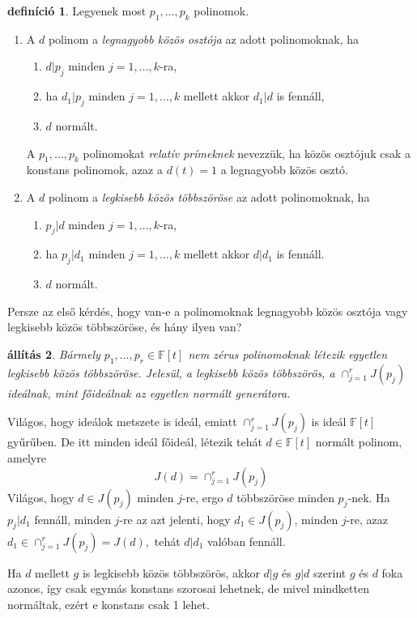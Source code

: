 \documentclass[a4paper, showtrims]{memoir}
\makeatletter
\renewenvironment{proof}[1][\proofname]
    {\par\pushQED{\qed}%
    \normalfont \topsep6\p@\@plus6\p@\relax
    \trivlist
    \item[\hskip\labelsep
        \itshape
    #1\@addpunct{:}]\ignorespaces}
    {\popQED\endtrivlist\@endpefalse}
\theoremstyle{plain}
\newtheorem{proposition}{állítás}[chapter]
\theoremstyle{remark}
\theoremstyle{definition}
\newtheorem{definition}[proposition]{definíció}
\makeatother
\begin{document}
\begin{definition}
	Legyenek most $p_1,\ldots,p_k$ polinomok.
	\begin{enumerate}
		\item A $d$ polinom a \emph{legnagyobb közös osztója} az adott polinomoknak,
		      ha
		      \begin{enumerate}
			      \item $d|p_j$ minden $j=1,\ldots,k$-ra,
			      \item ha $d_1|p_j$ minden $j=1,\ldots,k$ mellett akkor $d_1|d$ is fennáll,
			      \item $d$ normált.
		      \end{enumerate}
		      A $p_1,\ldots,p_k$ polinomokat \emph{relatív prímeknek} nevezzük,
		      ha közös osztójuk csak a konstans polinomok,
		      azaz a $d\left( t \right)=1$ a legnagyobb közös osztó.
		\item A $d$ polinom a \emph{legkisebb közös többszöröse} az adott polinomoknak,
		      ha
		      \begin{enumerate}
			      \item $p_j|d$ minden $j=1,\ldots,k$-ra,
			      \item ha $p_j|d_1$ minden $j=1,\ldots,k$ mellett akkor $d|d_1$ is fennáll.
			      \item $d$ normált.\qedhere
		      \end{enumerate}
	\end{enumerate}
\end{definition}
Persze az első kérdés, hogy van-e a polinomoknak legnagyobb közös osztója vagy legkisebb közös többszöröse, és hány ilyen van?
\begin{proposition}\label{pr:lkkt}
	Bármely $p_1,\ldots,p_r\in\mathbb{F}\left[ t \right]$ nem zérus polinomoknak
	létezik egyetlen legkisebb közös többszöröse.
	Jelesül, a legkisebb közös többszörös, a
	\(
	\cap_{j=1}^rJ\left( p_j \right)
	\) ideálnak, mint főideálnak az egyetlen normált generátora.
\end{proposition}
\begin{proof}
	Világos, hogy ideálok metszete is ideál, emiatt
	\(
	\cap_{j=1}^rJ\left( p_j \right)
	\)
	is ideál $\mathbb{F}\left[ t \right]$ gyűrűben.
	De itt minden ideál főideál, létezik tehát $d\in\mathbb{F}\left[ t \right]$ normált polinom, amelyre
	\[
		J\left( d \right)
		=
		\cap_{j=1}^rJ\left( p_j \right)
	\]
	Világos, hogy $d\in J\left( p_j \right)$ minden $j$-re,
	ergo $d$ többszöröse minden $p_j$-nek.
	Ha $p_j|d_1$ fennáll, minden $j$-re
	az azt jelenti, hogy $d_1\in J\left( p_j \right)$, minden $j$-re, azaz
	\(
	d_1
	\in
	\cap_{j=1}^rJ\left( p_j \right)
	=
	J\left( d \right),
	\)
	tehát $d|d_1$ valóban fennáll.

	Ha $d$ mellett $g$ is legkisebb közös többszörös, akkor $d|g$ és $g|d$ szerint $g$ és $d$ foka azonos,
	így csak egymás konstans szorosai lehetnek, de mivel mindketten normáltak, ezért e konstans csak 1 lehet.
\end{proof}
\end{document}
